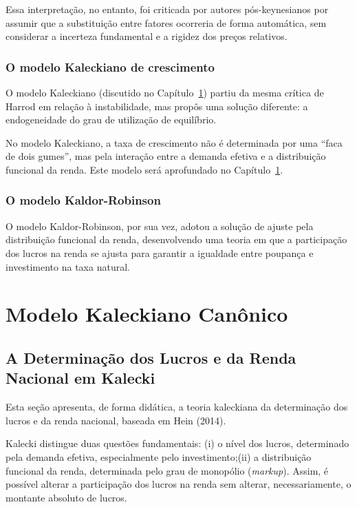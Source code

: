\documentclass[
  brazilian,
  letterpaper,
  DIV=11,
  numbers=noendperiod]{scrreprt}
\begin{document}
Essa interpretação, no entanto, foi criticada por autores
pós-keynesianos por assumir que a substituição entre fatores ocorreria
de forma automática, sem considerar a incerteza fundamental e a rigidez
dos preços relativos.

\subsection{O modelo Kaleckiano de
crescimento}\label{o-modelo-kaleckiano-de-crescimento}

O modelo Kaleckiano (discutido no Capítulo~\ref{sec-modelo-kal}) partiu
da mesma crítica de Harrod em relação à instabilidade, mas propôs uma
solução diferente: a endogeneidade do grau de utilização de equilíbrio.

No modelo Kaleckiano, a taxa de crescimento não é determinada por uma
``faca de dois gumes'', mas pela interação entre a demanda efetiva e a
distribuição funcional da renda. Este modelo será aprofundado no
Capítulo~\ref{sec-modelo-kal}.

\subsection{O modelo Kaldor-Robinson}\label{o-modelo-kaldor-robinson}

O modelo Kaldor-Robinson, por sua vez, adotou a solução de ajuste pela
distribuição funcional da renda, desenvolvendo uma teoria em que a
participação dos lucros na renda se ajusta para garantir a igualdade
entre poupança e investimento na taxa natural.


\chapter{Modelo Kaleckiano Canônico}\label{sec-modelo-kal}

\section{A Determinação dos Lucros e da Renda Nacional em
Kalecki}\label{sec-renda}

Esta seção apresenta, de forma didática, a teoria kaleckiana da
determinação dos lucros e da renda nacional, baseada em Hein (2014).

Kalecki distingue duas questões fundamentais: (i) o nível dos lucros,
determinado pela demanda efetiva, especialmente pelo investimento;(ii) a
distribuição funcional da renda, determinada pelo grau de monopólio
(\emph{markup}). Assim, é possível alterar a participação dos lucros na
renda sem alterar, necessariamente, o montante absoluto de lucros.
\end{document}
